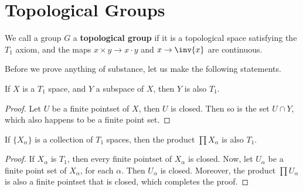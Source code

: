 
\section{Topological Groups}

\begin{definition}
    We call a group $G$ a  \textbf{topological group} if it is a topological
    space satisfying the $T_1$ axiom, and the maps $x \times y \rightarrow x
    \cdot y$ and $x \rightarrow \inv{x}$ are continuous.
\end{definition}

Before we prove anything of substance, let us make the following statements.

\begin{lemma}\label{2.5.2}
    If $X$ is a  $T_1$ space, and $Y$ a subspace of  $X$, then  $Y$ is also
    $T_1$.
\end{lemma}
\begin{proof}
    Let $U$ be a finite pointset of  $X$, then  $U$ is closed. Then so is the
    set  $U \cap Y$, which also happens to be a finite point set.
\end{proof}

\begin{lemma}\label{2.5.2}
    If $\{X_\alpha\}$ is a collection of $T_1$ spaces, then the product
    $\prod{X_\alpha}$ is also $T_1$.
\end{lemma}
\begin{proof}
    If $X_\alpha$ is  $T_1$, then every finite pointset of $X_\alpha$ is closed.
    Now, let  $U_\alpha$ be a finite point set of  $X_\alpha$, for each
    $\alpha$. Then  $U_\alpha$ is closed. Moreover, the product
    $\prod{U_\alpha}$ is also a finite pointset that is closed, which completes
    the proof.
\end{proof}

